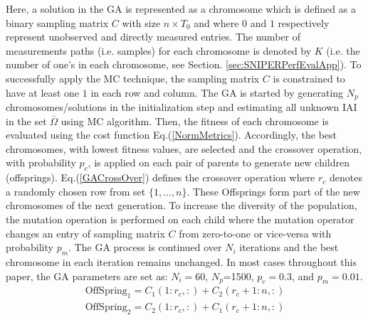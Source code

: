 Here, a solution in the GA is represented as a chromosome which is defined as a binary sampling matrix $C$ with size $n \times T_{0}$ and where $0$ and $1$ respectively represent unobserved and directly measured entries. The number of measurements paths (i.e. samples) for each chromosome is denoted by $K$ (i.e. the number of one's in each chromosome, see Section. \ref{sec:SNIPERPerfEvalApp}). To successfully apply the MC technique, the sampling matrix $C$ is constrained to have at least one $1$ in each row and column. The GA is started by generating $N_{p}$ chromosomes/solutions in the initialization step and estimating all unknown IAI in the set $\bar{\Omega}$ using MC algorithm. Then, the fitness of each chromosome is evaluated using the cost function Eq.(\ref{NormMetrics}). Accordingly, the best chromosomes, with lowest fitness values, are selected and the crossover operation, with probability $p_{c}$, is applied on each pair of parents to generate new children (offsprings). Eq.(\ref{GACrossOver}) defines the crossover operation where $r_{c}$ denotes a randomly chosen row from set $\{1,...,n\}$. These Offsprings form part of the new chromosomes of the next generation. To increase the diversity of the population, the mutation operation is performed on each child where the mutation operator changes an entry of sampling matrix $C$ from zero-to-one or vice-versa with probability $p_{m}$. The GA process is continued over $N_{i}$ iterations and the best chromosome in each iteration remains unchanged. In most cases throughout this paper, the GA parameters are set as: $N_{i}=60$, $N_{p}$=1500, $p_{c}=0.3$, and $p_{m}=0.01$.
\begin{equation} \label{GACrossOver}
\begin{aligned}
\text{OffSpring}_{1} = C_{1}(1:r_{c},:) + C_{2}(r_{c}+1:n,:) \\
\text{OffSpring}_{2} = C_{2}(1:r_{c},:) + C_{1}(r_{c}+1:n,:) 
\end{aligned}
\end{equation}

